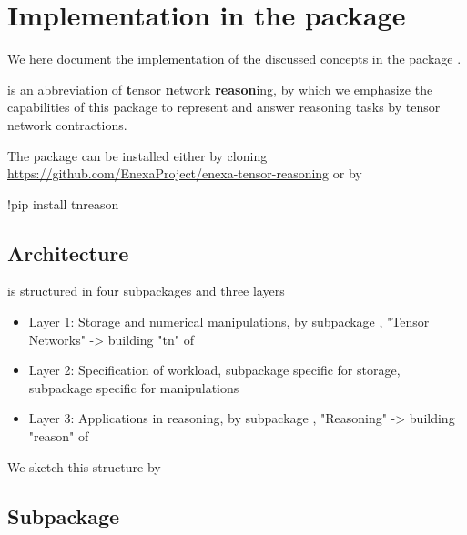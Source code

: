 \section{Implementation in the \tnreason package}\label{cha:implementation}

We here document the implementation of the discussed concepts in the \python package \tnreason.
 
\tnreason is an abbreviation of \textbf{t}ensor \textbf{n}etwork \textbf{reason}ing, by which we emphasize the capabilities of this package to represent and answer reasoning tasks by tensor network contractions. 

The package can be installed either by cloning \href{https://github.com/EnexaProject/enexa-tensor-reasoning}{https://github.com/EnexaProject/enexa-tensor-reasoning} or by
\begin{centeredcode}
	!pip install tnreason
\end{centeredcode}














\subsection{Architecture}

\tnreason is structured in four subpackages and three layers
\begin{itemize}
	\item Layer 1: Storage and numerical manipulations, by subpackage \spengine, "Tensor Networks" -> building "tn" of \tnreason
	\item Layer 2: Specification of workload, subpackage \spencoding specific for storage, subpackage \spalgorithms specific for manipulations
	\item Layer 3: Applications in reasoning, by subpackage \spknowledge, "Reasoning" -> building "reason" of \tnreason
\end{itemize}

We sketch this structure by
\begin{center}

\end{center}



\subsection{Subpackage \spengine}

